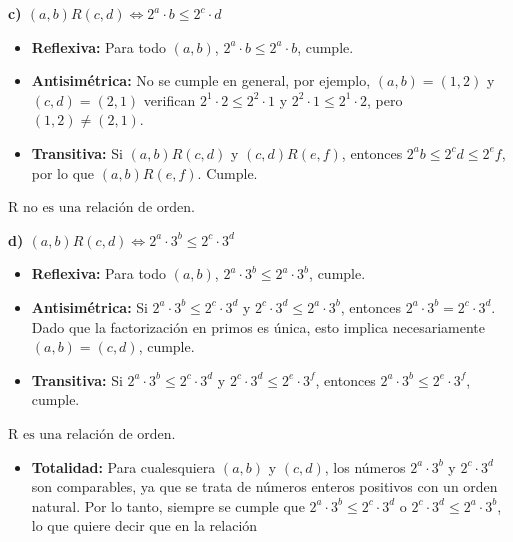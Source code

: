 \documentclass[a4paper,12pt]{article}
\begin{document}
\begin{ejercicio}[title=Ejercicio 16]
\textbf{c) $(a,b)R(c,d) \iff 2^a \cdot b \le 2^c \cdot d$}

\begin{itemize}
\item \textbf{Reflexiva:} Para todo $(a,b)$, $2^a \cdot b \le 2^a \cdot b$, cumple.
\item \textbf{Antisimétrica:} No se cumple en general, por ejemplo, $(a,b)=(1,2)$ y $(c,d)=(2,1)$ verifican $2^1\cdot 2 \le 2^2\cdot 1$ y $2^2\cdot 1 \le 2^1\cdot 2$, pero $(1,2) \neq (2,1)$.
\item \textbf{Transitiva:} Si $(a,b)R(c,d)$ y $(c,d)R(e,f)$, entonces $2^a b \le 2^c d \le 2^e f$, por lo que $(a,b)R(e,f)$. Cumple.
\end{itemize}

\(\boxed{\text{R no es una relación de orden.}}\)

\end{ejercicio}

\begin{ejercicio}[title=Ejercicio 16]

\textbf{d) $(a,b)R(c,d) \iff 2^a \cdot 3^b \le 2^c \cdot 3^d$}

\begin{itemize}
\item \textbf{Reflexiva:} Para todo $(a,b)$, $2^a \cdot 3^b \le 2^a \cdot 3^b$, cumple.
\item \textbf{Antisimétrica:} Si $2^a \cdot 3^b \le 2^c \cdot 3^d$ y $2^c \cdot 3^d \le 2^a \cdot 3^b$, entonces $2^a \cdot 3^b = 2^c \cdot 3^d$. Dado que la factorización en primos es única, esto implica necesariamente $(a,b) = (c,d)$, cumple.
\item \textbf{Transitiva:} Si $2^a \cdot 3^b \le 2^c \cdot 3^d$ y $2^c \cdot 3^d \le 2^e \cdot 3^f$, entonces $2^a \cdot 3^b \le 2^e \cdot 3^f$, cumple.
\end{itemize}

\(\boxed{\text{R es una relación de orden.}}\)

\begin{itemize}
    \item \textbf{Totalidad:} Para cualesquiera $(a,b)$ y $(c,d)$, los números $2^a \cdot 3^b$ y $2^c \cdot 3^d$ son comparables, ya que se trata de números enteros positivos con un orden natural. Por lo tanto, siempre se cumple que $2^a \cdot 3^b \le 2^c \cdot 3^d$ o $2^c \cdot 3^d \le 2^a \cdot 3^b$, lo que quiere decir que en la relación 
\end{itemize}

\end{ejercicio}
\end{document}
